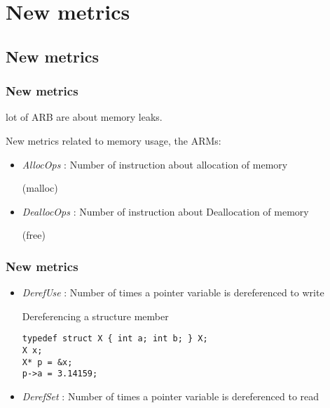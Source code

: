 \section{New metrics}

\subsection{New metrics}
\begin{frame}
 \frametitle{New metrics}
 \begin{center}
  \alert{lot of ARB are about memory leaks.}
 \end{center}
 New metrics related to memory usage, the \alert{ARMs}:
 \vfill
 \begin{itemize}
  \item \emph{AllocOps} : Number of instruction about allocation of memory
   \begin{center}
    (malloc)
   \end{center}
  \item \emph{DeallocOps} : Number of instruction about Deallocation of memory
   \begin{center}
    (free)
   \end{center}
 \end{itemize}
\end{frame}

\begin{frame}[fragile]
 \frametitle{New metrics}
 \begin{itemize}
  \item \emph{DerefUse} : Number of times a pointer variable is dereferenced to write
   \begin{exampleblock}{Dereferencing a structure member}
    \begin{verbatim}typedef struct X { int a; int b; } X;
X x;
X* p = &x;
p->a = 3.14159;\end{verbatim}
   \end{exampleblock}
  \item \emph{DerefSet} : Number of times a pointer variable is dereferenced to read
 \end{itemize}
\end{frame}

